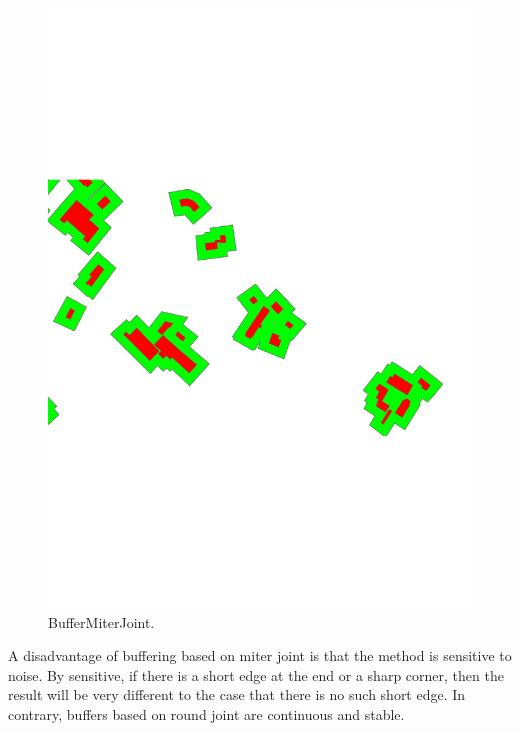 \documentclass[graybox]{svmult}
\begin{document}
\begin{figure}[tb]
	\centering
	\includegraphics[width=\linewidth]{BufferMiterJoint}
	\caption{BufferMiterJoint.}
	\label{fig:BufferMiterJoint}
\end{figure}




A disadvantage of buffering based on miter joint is that the 
method is sensitive to noise. By sensitive, if there is a short 
edge at the end or a sharp corner, then the result will be very 
different to the case that there is no such short edge. In 
contrary, buffers based on round joint are continuous and stable.
\end{document}
